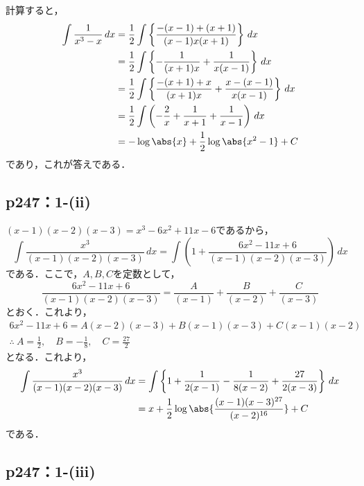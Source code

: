 \documentclass[uplatex,dvipdfmx,a4paper,10pt,fleqn]{jsarticle}
\begin{document}
\begin{tleftbar}
    計算すると，
    \begin{align*}
        \int \frac{1}{x^3-x} \, dx & = \frac{1}{2} \int \left \{ \frac{-(x-1)+(x+1)}{(x-1)x(x+1)} \right \} \, dx \\
        & = \frac{1}{2} \int \left \{ -\frac{1}{(x+1)x}+\frac{1}{x(x-1)} \right \} \, dx \\
        & = \frac{1}{2} \int \left \{ \frac{-(x+1)+x}{(x+1)x} + \frac{x-(x-1)}{x(x-1)} \right \} \, dx \\
        & = \frac{1}{2} \int \left ( -\frac{2}{x}+\frac{1}{x+1}+\frac{1}{x-1} \right) \, dx \\
        & = -\log \abs{x} + \frac{1}{2} \log \abs{x^2-1}+ C
    \end{align*}
    であり，これが答えである．
\end{tleftbar}


\subsection*{p247：1-(ii)}

\begin{tleftbar}
    $(x-1)(x-2)(x-3)=x^3 -6x^2+11x-6$であるから，
    \[
        \int \frac{x^3}{(x-1)(x-2)(x-3)} \, dx  = \int \left (1+ \frac{6x^2-11x+6}{(x-1)(x-2)(x-3)}\right) \, dx
    \]
    である．ここで，$A,B,C$を定数として，
    \[
        \frac{6x^2-11x+6}{(x-1)(x-2)(x-3)} = \frac{A}{(x-1)}+\frac{B}{(x-2)}+\frac{C}{(x-3)}
    \]
    とおく．これより，
    \begin{gather*}
        6x^2-11x+6 = A(x-2)(x-3)+B (x-1)(x-3)+C(x-1)(x-2) \\
        \therefore ~ A = \frac{1}{2}, \quad B = -\frac{1}{8},\quad C= \frac{27}{2}
    \end{gather*}
    となる．これより，
    \begin{align*}
        \int \frac{x^3}{(x-1)(x-2)(x-3)} \, dx & = \int \left \{ 1+ \frac{1}{2(x-1)} - \frac{1}{8(x-2)}+\frac{27}{2(x-3)} \right \} \, dx  \\
        & = x + \frac{1}{2} \log \abs{\frac{(x-1)(x-3)^{27}}{(x-2)^{16}}}+C
    \end{align*}
    である．
\end{tleftbar}

\subsection*{p247：1-(iii)}
\end{document}
